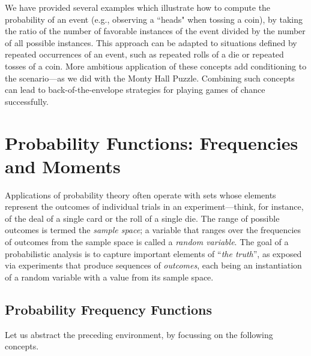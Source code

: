 \medskip


We have provided several examples which illustrate how to compute the probability of an event
(e.g., observing a ``heads" when tossing a coin), by taking the ratio of the number of favorable 
instances of the event divided by the number of all possible instances. This approach can be adapted to situations defined by repeated occurrences of an event, such as repeated rolls of a  die or repeated tosses of a coin.  More ambitious application of these concepts add conditioning to the scenario---as we did with the Monty Hall Puzzle.  Combining such concepts can lead to back-of-the-envelope strategies for playing games of chance successfully.


\section{Probability Functions: Frequencies and Moments}
\label{sec:prob-distributions}
\label{sec:prob-freq-fns+measures}

 
 

Applications of probability theory often operate with sets whose elements represent the outcomes of individual trials in an experiment---think, for instance, of the deal of a single card or the roll of a single die.  The range of possible outcomes is termed the {\it sample space}; a variable that ranges over the frequencies of outcomes from the sample space is called a {\it random variable}.  The goal of a probabilistic analysis is to capture important elements of ``{\em the truth}'', as exposed via experiments that produce sequences of {\em outcomes}, each being an instantiation of a random variable with a value from its sample space.

\subsection{Probability Frequency Functions}
\label{sec:prob-freq-fns}

Let us abstract the preceding environment, by focussing on the following concepts.

